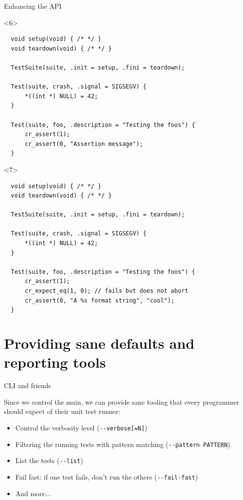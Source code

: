 \documentclass[10pt]{beamer}
\begin{document}
\begin{frame}[fragile]{Enhancing the API}
  \begin{onlyenv}<6>
  \begin{lstlisting}
  void setup(void) { /* */ }
  void teardown(void) { /* */ }

  TestSuite(suite, .init = setup, .fini = teardown);

  Test(suite, crash, .signal = SIGSEGV) {
      *((int *) NULL) = 42;
  }

  Test(suite, foo, .description = "Testing the foos") {
      cr_assert(1);
      cr_assert(0, "Assertion message");
  }
  \end{lstlisting}
  \end{onlyenv}

  \begin{onlyenv}<7>
  \begin{lstlisting}
  void setup(void) { /* */ }
  void teardown(void) { /* */ }

  TestSuite(suite, .init = setup, .fini = teardown);

  Test(suite, crash, .signal = SIGSEGV) {
      *((int *) NULL) = 42;
  }

  Test(suite, foo, .description = "Testing the foos") {
      cr_assert(1);
      cr_expect_eq(1, 0); // fails but does not abort
      cr_assert(0, "A %s format string", "cool");
  }
  \end{lstlisting}
  \end{onlyenv}

\end{frame}

\section{Providing sane defaults and reporting tools}

\begin{frame}[fragile]{CLI and friends}

  Since we control the main, we can provide
  sane tooling that every programmer should expect of
  their unit test runner:

  \begin{itemize}
    \item Control the verbosity level (\verb|--verbose[=N]|)
    \item Filtering the running tests with pattern matching (\verb|--pattern PATTERN|)
    \item List the tests (\verb|--list|)
    \item Fail fast: if one test fails, don't run the others (\verb|--fail-fast|)
    \item And more...
  \end{itemize}

\end{frame}
\end{document}
